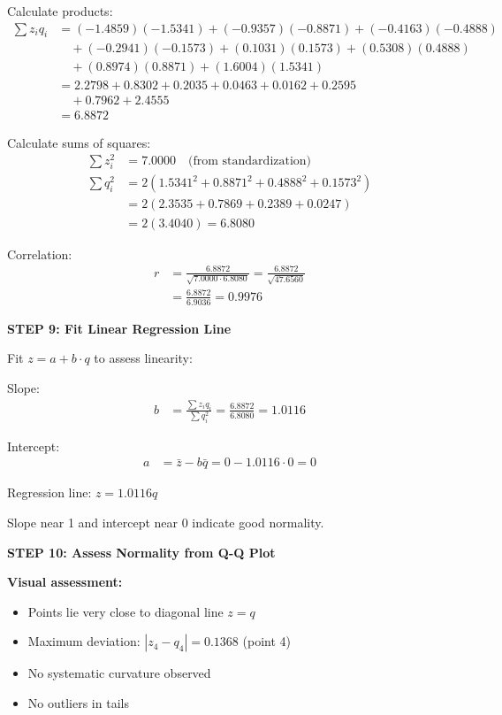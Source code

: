 \documentclass[12pt]{article}
\begin{document}
\begin{solution}
Calculate products:
\begin{align*}
\sum z_i q_i &= (-1.4859)(-1.5341) + (-0.9357)(-0.8871) + (-0.4163)(-0.4888) \\
&\quad + (-0.2941)(-0.1573) + (0.1031)(0.1573) + (0.5308)(0.4888) \\
&\quad + (0.8974)(0.8871) + (1.6004)(1.5341) \\
&= 2.2798 + 0.8302 + 0.2035 + 0.0463 + 0.0162 + 0.2595 \\
&\quad + 0.7962 + 2.4555 \\
&= 6.8872
\end{align*}

Calculate sums of squares:
\begin{align*}
\sum z_i^2 &= 7.0000 \quad \text{(from standardization)} \\
\sum q_i^2 &= 2(1.5341^2 + 0.8871^2 + 0.4888^2 + 0.1573^2) \\
&= 2(2.3535 + 0.7869 + 0.2389 + 0.0247) \\
&= 2(3.4040) = 6.8080
\end{align*}

Correlation:
\begin{align*}
r &= \frac{6.8872}{\sqrt{7.0000 \cdot 6.8080}} = \frac{6.8872}{\sqrt{47.6560}} \\
&= \frac{6.8872}{6.9036} = 0.9976
\end{align*}

\textbf{STEP 9: Fit Linear Regression Line}

Fit $z = a + b \cdot q$ to assess linearity:

Slope:
\begin{align*}
b &= \frac{\sum z_i q_i}{\sum q_i^2} = \frac{6.8872}{6.8080} = 1.0116
\end{align*}

Intercept:
\begin{align*}
a &= \bar{z} - b \bar{q} = 0 - 1.0116 \cdot 0 = 0
\end{align*}

Regression line: $z = 1.0116 q$

Slope near 1 and intercept near 0 indicate good normality.

\textbf{STEP 10: Assess Normality from Q-Q Plot}

\textbf{Visual assessment:}
\begin{itemize}
\item Points lie very close to diagonal line $z = q$
\item Maximum deviation: $|z_4 - q_4| = 0.1368$ (point 4)
\item No systematic curvature observed
\item No outliers in tails
\end{itemize}


\end{solution}
\end{document}
